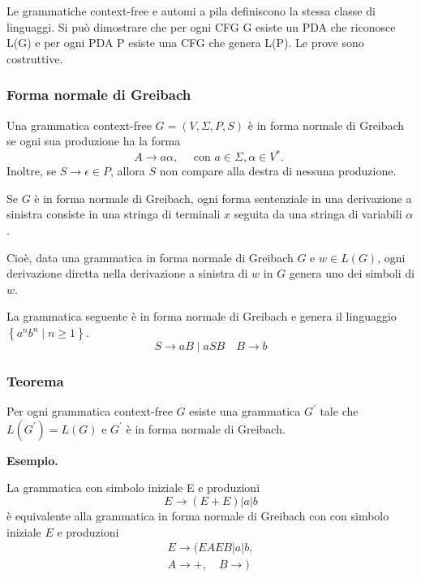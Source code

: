 \vspace{5mm}

Le grammatiche context-free e automi a pila definiscono la stessa
classe di linguaggi.
Si può dimostrare che per ogni CFG G esiste un PDA che
riconosce L(G) e per ogni PDA P esiste una CFG che genera L(P).
Le prove sono costruttive.

\subsubsection{Forma normale di Greibach}

Una grammatica context-free $G=(V, \Sigma, P, S)$ è in forma normale di Greibach se ogni sua produzione ha la forma
$$
A \rightarrow a \alpha, \quad \text { con } a \in \Sigma, \alpha \in V^{*} \text {. }
$$
Inoltre, se $S \rightarrow \epsilon \in P$, allora $S$ non compare alla destra di nessuna produzione.

Se $G$ è in forma normale di Greibach, ogni forma sentenziale in una derivazione a sinistra consiste in una stringa di terminali $x$ seguita da una stringa di variabili $\alpha$.

Cioè, data una grammatica in forma normale di Greibach $G$ e $w \in L(G)$, ogni derivazione diretta nella derivazione a sinistra di $w$ in $G$ genera uno dei simboli di $w$.

\vspace{5mm}

La grammatica seguente è in forma normale di Greibach e genera il linguaggio $\left\{a^{n} b^{n} \mid n \geq 1\right\}$.
$$
S \rightarrow a B \mid a S B \quad B \rightarrow b
$$

\subsubsection{Teorema}
Per ogni grammatica context-free $G$ esiste una grammatica $G^{\prime}$ tale che $L\left(G^{\prime}\right)=L(G)$ e $G^{\prime}$ è in forma normale di Greibach.

\textbf{Esempio.}

La grammatica con simbolo iniziale E e produzioni
$$
E \rightarrow(E+E)|a| b
$$
è equivalente alla grammatica in forma normale di Greibach con con simbolo iniziale $E$ e produzioni
$$
\begin{gathered}
E \rightarrow(E A E B|a| b, \\
A \rightarrow+, \quad B \rightarrow)
\end{gathered}
$$

